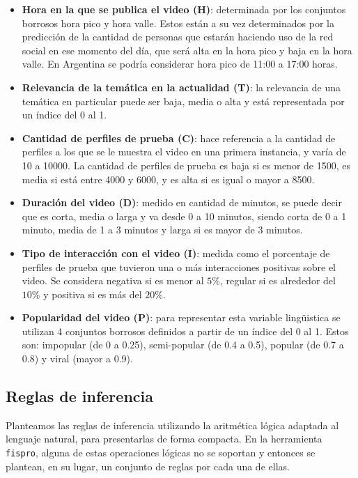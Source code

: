 \documentclass{article}
\begin{document}
\begin{itemize}
	\item \textbf{Hora en la que se publica el video (H)}: determinada por los conjuntos borrosos hora pico y hora valle. Estos están a su vez determinados por la predicción de la cantidad de personas que estarán haciendo uso de la red social en ese momento del día, que será alta en la hora pico y baja en la hora valle. En Argentina se podría considerar hora pico de 11:00 a 17:00 horas.
	\item \textbf{Relevancia de la temática en la actualidad (T)}: la relevancia de una temática en particular puede ser baja, media o alta y está representada por un índice del 0 al 1.
 	\item \textbf{Cantidad de perfiles de prueba (C)}: hace referencia a la cantidad de perfiles a los que se le muestra el video en una primera instancia, y varía de 10 a 10000. La cantidad de perfiles de prueba es baja si es menor de 1500, es media si está entre 4000 y 6000, y es alta si es igual o mayor a 8500.
 	\item \textbf{Duración del video (D)}: medido en cantidad de minutos, se puede decir que es corta, media o larga y va desde 0 a 10 minutos, siendo corta de 0 a 1 minuto, media de 1 a 3 minutos y larga si es mayor de 3 minutos.
	\item \textbf{Tipo de interacción con el video (I)}: medida como el porcentaje de perfiles de prueba que tuvieron una o más interacciones positivas sobre el video. Se considera negativa si es menor al $5\%$, regular si es alrededor del $10\%$ y positiva si es más del $20\%$.
	\item \textbf{Popularidad del video (P)}: para representar esta variable lingüistica se utilizan 4 conjuntos borrosos definidos a partir de un índice del 0 al 1. Estos son: impopular (de 0 a 0.25), semi-popular (de 0.4 a 0.5), popular (de 0.7 a 0.8) y viral (mayor a 0.9).
\end{itemize}

\subsection{Reglas de inferencia}

Planteamos las reglas de inferencia utilizando la aritmética lógica adaptada al lenguaje natural, para presentarlas de forma compacta. En la herramienta \\ \verb|fispro|, alguna de estas operaciones lógicas no se soportan y entonces se plantean, en su lugar, un conjunto de reglas por cada una de ellas.
\end{document}
